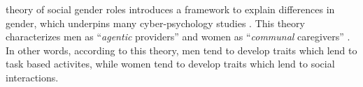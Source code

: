  theory of social gender roles introduces a framework to explain differences in gender, which underpins many cyber-psychology studies \citep{Hum2011, Kimbrough2013, Tifferet2014}. This theory characterizes men as ``\emph{agentic} providers'' and women as ``\emph{communal} caregivers'' \citep[p. 1830]{Hum2011}. In other words, according to this theory, men tend to develop traits which lend to task based activites, while women tend to develop traits which lend to social interactions.